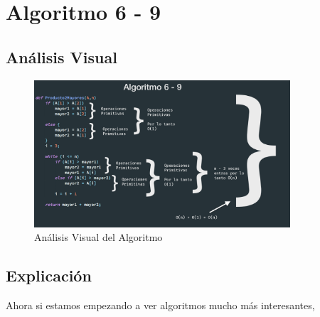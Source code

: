 \documentclass[12pt, fleqn]{article}                            %
\theoremstyle{break}                                            %
\begin{document}
\clearpage
\section{Algoritmo 6 - 9}


    \subsection{Análisis Visual}

        \begin{figure}[h]
            \centering
            \includegraphics[width=0.85\textwidth]{Algoritmo6}
            \caption{Análisis Visual del Algoritmo}
        \end{figure}

    \vspace{1em}
    \subsection{Explicación}

        Ahora si estamos empezando a ver algoritmos mucho más interesantes,  
\end{document}
